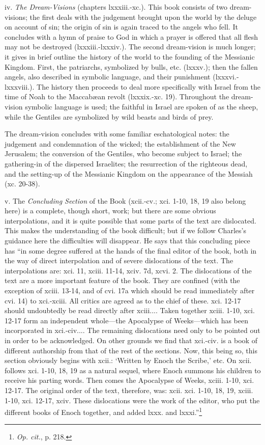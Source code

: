 iv. \emph{The Dream-Visions} (chapters lxxxiii.-xc.). This
book consists of two dream-visions; the first deals
with the judgement brought upon the world by the
deluge on account of sin; the origin of sin is again
traced to the angels who fell. It concludes with a
hymn of praise to God in which a prayer is offered
that all flesh may not be destroyed (lxxxiii.-lxxxiv.).
The second dream-vision is much longer; it gives in
brief outline the history of the world to the founding
of the Messianic Kingdom. First, the patriarchs,
symbolized by bulls, etc. (lxxxv.); then the fallen
angels, also described in symbolic language, and their
punishment (lxxxvi.-lxxxviii.). The history then
proceeds to deal more specifically with Israel from the
time of Noah to the Maccabæan revolt (lxxxix.-xc.
19). Throughout the dream-vision symbolic language
is used; the faithful in Israel are spoken of as the
sheep, while the Gentiles are symbolized by wild
beasts and birds of prey.

The dream-vision concludes with some familiar
eschatological notes: the judgement and condemnation
of the wicked; the establishment of the New
Jerusalem; the conversion of the Gentiles, who
become subject to Israel; the gathering-in of the
dispersed Israelites; the resurrection of the righteous
dead, and the setting-up of the Messianic Kingdom
on the appearance of the Messiah (xc. 20-38).

v. The \emph{Concluding Section} of the Book (xcii.-cv.;
xci. 1-10, 18, 19 also belong here) is a complete,
though short, work; but there are some obvious
interpolations, and it is quite possible that some
parts of the text are dislocated. This makes the
understanding of the book difficult; but if we follow
Charles’s guidance here the difficulties will disappear.
He says that this concluding piece has “in some
degree suffered at the hands of the final editor of
the book, both in the way of direct interpolation and
of severe dislocations of the text. The interpolations
are: xci. 11, xciii. 11-14, xciv. 7d, xcvi. 2. The
dislocations of the text are a more important feature
of the book. They are confined (with the exception
of xciii. 13-14, and of cvi. 17a which should be read
immediately after cvi. 14) to xci.-xciii. All critics
are agreed as to the chief of these. xci. 12-17
should undoubtedly be read directly after xciii....
Taken together xciii. 1-10, xci. 12-17 form an
independent whole—the Apocalypse of Weeks—which
has been incorporated in xci.-civ.... The
remaining dislocations need only to be pointed out
in order to be acknowledged. On other grounds we
find that xci.-civ. is a book of different authorship
from that of the rest of the sections. Now, this
being so, this section obviously begins with xcii.:
‘Written by Enoch the Scribe,’ etc. On xcii.
follows xci. 1-10, 18, 19 as a natural sequel, where
Enoch summons his children to receive his parting
words. Then comes the Apocalypse of Weeks,
xciii. 1-10, xci. 12-17. The original order of the text,
therefore, was: xcii. xci. 1-10, 18, 19, xciii. 1-10,
xci. 12-17, xciv. These dislocations were the work
of the editor, who put the different books of Enoch
together, and added lxxx. and lxxxi.”\footnote{\emph{Op. cit.}, p. 218.}

